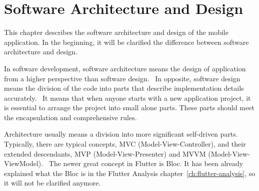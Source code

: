 \chapter{Software Architecture and Design}\label{ch:software-architecture-and-design}
This chapter describes the software architecture and design of the mobile application.
In the beginning, it will be clarified the difference between software architecture and design.

In software development, software architecture means the design of application from a higher perspective than software design.~\cite{softwareArchitecture}
In opposite, software design means the division of the code into parts that describe implementation details accurately.~\cite{softwareDesign}
It means that when anyone starts with a new application project, it is essential to arrange the project into small alone parts.
These parts should meet the encapsulation and comprehensive rules.

Architecture usually means a division into more significant self-driven parts.
Typically, there are typical concepts, MVC (Model-View-Controller), and their extended descendants, MVP (Model-View-Presenter) and MVVM (Model-View-ViewModel).~\cite{mvc}
The newer great concept in Flutter is Bloc.
It has been already explained what the Bloc is in the Flutter Analysis chapter~\ref{ch:flutter-analysis}, so it will not be clarified anymore.



